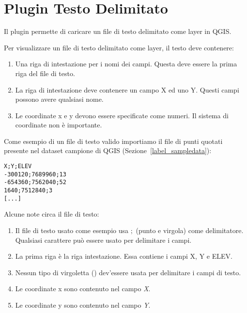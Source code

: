 
\section{Plugin Testo Delimitato}\label{label_dltext}    


Il plugin permette di caricare un file di testo delimitato come layer in QGIS.


Per visualizzare un file di testo delimitato come layer, il testo deve contenere:

\begin{enumerate}
\item Una riga di intestazione per i nomi dei campi. Questa deve essere la prima riga del file di testo.
\item La riga di intestazione deve contenere un campo X ed uno Y. Questi campi possono avere qualsiasi nome.
\item Le coordinate x e y devono essere specificate come numeri. Il sistema di coordinate non è importante.
\end{enumerate}

Come esempio di un file di testo valido importiamo il file di punti quotati  presente 
nel dataset campione di QGIS (Sezione~\ref{label_sampledata}):

\begin{verbatim} 
X;Y;ELEV
-300120;7689960;13
-654360;7562040;52
1640;7512840;3
[...]
\end{verbatim}

Alcune note circa il file di testo:

\begin{enumerate}
\item Il file di testo usato come esempio usa \mbox{$;$} (punto e virgola) come delimitatore. Qualsiasi carattere può 
essere usato per delimitare i campi.
\item La prima riga è la riga intestazione. Essa contiene i campi X, Y e ELEV.
\item Nessun tipo di virgoletta (\textquotedbl) dev'essere usata per delimitare i campi di testo.
\item Le coordinate x sono contenuto nel campo {\em X}.
\item Le coordinate y sono contenuto nel campo {\em Y}.
\end{enumerate}

